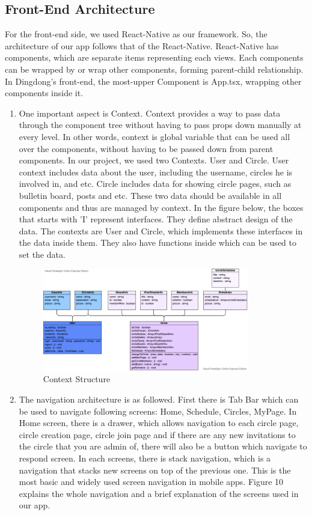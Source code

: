 \documentclass[conference]{IEEEtran}
\begin{document}
\subsection{Front-End Architecture}
For the front-end side, we used React-Native as our framework. So, the architecture of our app follows that of the React-Native. React-Native has components, which are separate items representing each views. Each components can be wrapped by or wrap other components, forming parent-child relationship. In Dingdong's front-end, the most-upper Component is App.tsx, wrapping other components inside it.
\begin{enumerate}
    \item One important aspect is Context. Context provides a way to pass data through the component tree without having to pass props down manually at every level. In other words, context is global variable that can be used all over the components, without having to be passed down from parent components.
    In our project, we used two Contexts. User and Circle. User context includes data about the user, including the username, circles he is involved in, and etc. Circle includes data for showing circle pages, such as bulletin board, posts and etc. These two data should be available in all components and thus are managed by context. In the figure below, the boxes that starts with 'I' represent interfaces. They define abstract design of the data. The contexts are User and Circle, which implements these interfaces in the data inside them. They also have functions inside which can be used to set the data.
    \begin{figure}[h]
        \includegraphics[width=9cm]{images/context.png}
        \caption{Context Structure}
        \label{fig: Views}
    \end{figure}
    \item The navigation architecture is as followed. First there is Tab Bar which can be used to navigate following screens: Home, Schedule, Circles, MyPage. In Home screen, there is a drawer, which allows navigation to each circle page, circle creation page, circle join page and if there are any new invitations to the circle that you are admin of, there will also be a button which navigate to respond screen. In each screens, there is stack navigation, which is a navigation that stacks new screens on top of the previous one. This is the most basic and widely used screen navigation in mobile apps. Figure 10 explains the whole navigation and a brief explanation of the screens used in our app.
\end{enumerate}
\end{document}
